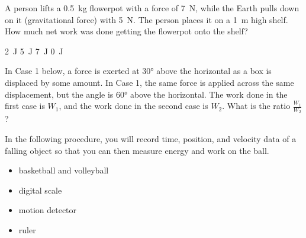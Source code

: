 \documentclass[../main-physics-problems.tex]{subfiles}
\begin{document}
\begin{questions}
\question
A person lifts a \SI{0.5}{kg} flowerpot with a force of \SI{7}{N}, while the Earth pulls down on it (gravitational force) with \SI{5}{N}. The person places it on a \SI{1}{m} high shelf. How much net work was done getting the flowerpot onto the shelf?

\begin{randomizechoices}
    \correctchoice \SI{2}{J}
    \choice \SI{5}{J}
    \choice \SI{7}{J}
    \choice \SI{0}{J}
\end{randomizechoices}

\question
In Case 1 below, a force is exerted at \ang{30} above the horizontal as a box is displaced by some amount. In Case 1, the same force is applied across the same displacement, but the angle is \ang{60} above the horizontal. The work done in the first case is $W_1$, and the work done in the second case is $W_2$. What is the ratio $\frac{W_1}{W_2}$?

\begin{center}

\vspace{1em}

\end{center}

\clearpage

\question
In the following procedure, you will record time, position, and velocity data of a falling object so that you can then measure energy and work on the ball. 

\begin{itemize}[itemsep=0pt,topsep=0pt]
    \item basketball and volleyball
    \item digital scale
    \item motion detector
    \item ruler
\end{itemize}


\end{questions}
\end{document}
